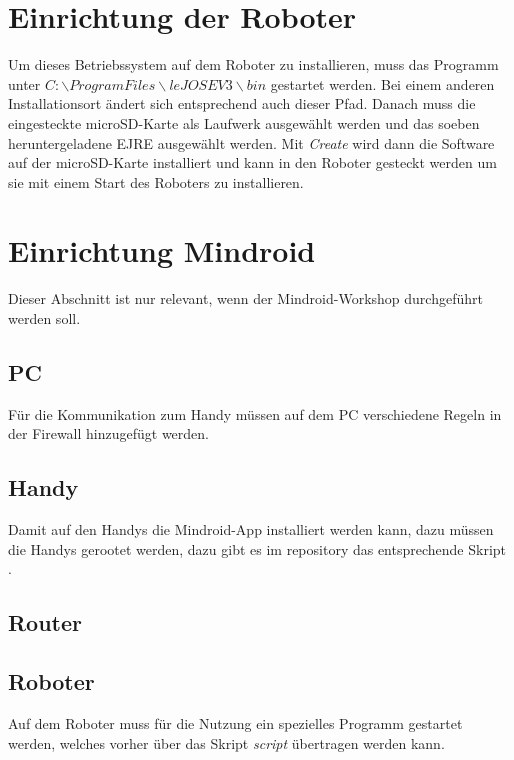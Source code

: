 \documentclass[
	ngerman,
	accentcolor=1c,%
	]{tudapub}
\begin{document}
\section{Einrichtung der Roboter}
Um dieses Betriebssystem auf dem Roboter zu installieren, muss das Programm unter \textit{$C:\backslash Program Files\backslash leJOS EV3\backslash bin$} gestartet werden. Bei einem anderen Installationsort \"andert sich entsprechend auch dieser Pfad.\newline
Danach muss die eingesteckte microSD-Karte als Laufwerk ausgew\"ahlt werden und das soeben heruntergeladene EJRE ausgew\"ahlt werden. Mit \textit{Create} wird dann die Software auf der microSD-Karte installiert und kann in den Roboter gesteckt werden um sie mit einem Start des Roboters zu installieren.

\section{Einrichtung Mindroid}
\label{Einrichtung-Mindroid}
Dieser Abschnitt ist nur relevant, wenn der Mindroid-Workshop durchgef\"uhrt werden soll.

\subsection{PC}
F\"ur die Kommunikation zum Handy m\"ussen auf dem PC verschiedene Regeln in der Firewall hinzugef\"ugt werden.

\subsection{Handy}
Damit auf den Handys die Mindroid-App installiert werden kann, dazu m\"ussen die Handys gerootet werden, dazu gibt es im repository das entsprechende Skript \textit{}.
\subsection{Router}

\subsection{Roboter}
Auf dem Roboter muss f\"ur die Nutzung ein spezielles Programm gestartet werden, welches vorher \"uber das Skript \textit{script} \"ubertragen werden kann.
\end{document}
